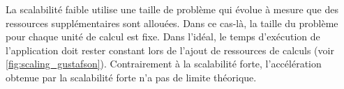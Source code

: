         La scalabilité faible utilise une taille de problème qui évolue à mesure que des ressources supplémentaires sont allouées. Dans ce cas-là, la taille du problème pour chaque unité de calcul est fixe. Dans l'idéal, le temps d'exécution de l'application doit rester constant lors de l'ajout de ressources de calculs (voir \autoref{fig:scaling_gustafson}). Contrairement à la scalabilité forte, l'accélération obtenue par la scalabilité forte n'a pas de limite théorique. 
        
        